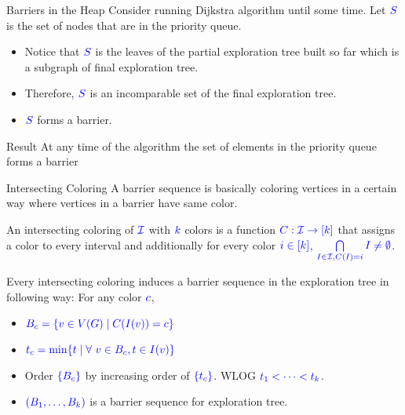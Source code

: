 \documentclass[10pt]{beamer}
\begin{document}
\begin{frame}{Barriers in the Heap}
	Consider running Dijkstra algorithm until some time. Let $\mathcolor{blue}{S}$ is the set of nodes that are in the priority queue.\pause
	\begin{itemize}
		\item Notice that $\mathcolor{blue}{S}$ is the leaves of the partial exploration tree built so far which is a subgraph of final exploration tree.\pause
		\item Therefore, $\mathcolor{blue}{S}$ is an incomparable set of the final exploration tree.
		\item $\mathcolor{blue}{S}$ forms a barrier.
	\end{itemize}\pause \vfill

	\begin{alertblock}{Result}
		At any time of the algorithm the set of elements in the priority queue forms a barrier
	\end{alertblock}
\end{frame}
\begin{frame}{Intersecting Coloring}
	A barrier sequence is basically coloring vertices in a certain way where vertices in a barrier have same color.\pause
	\begin{definition}
		An intersecting coloring of $\mathcolor{blue}{\mathcal{I}}$ with $\mathcolor{blue}{k}$ colors is a function $\mathcolor{blue}{C:\mathcal{I}\to [k]}$ that assigns a color to every interval and additionally for every color $\mathcolor{blue}{i\in[k]}$, $\mathcolor{blue}{\bigcap\limits_{I\in\mathcal{I}, C(I)=i}I\neq \emptyset}$.
	\end{definition}\pause \vfill

	Every intersecting coloring induces a barrier sequence in the exploration tree in following way: For any color $\mathcolor{blue}{c}$,\pause
	\begin{itemize}
		\item  $\mathcolor{blue}{B_c=\{v\in V(G)\mid C(I(v))=c\}}$\pause
		\item $\mathcolor{blue}{t_c=\min\{t\mid \forall\ v\in B_c, t\in I(v)\}}$\pause
		\item Order $\mathcolor{blue}{\{B_c\}}$ by increasing order of $\mathcolor{blue}{\{t_c\}}$. WLOG $\mathcolor{blue}{t_1<\cdots <t_k}$.\pause
		\item $\mathcolor{blue}{(B_1,\dots, B_k)}$ is a barrier sequence for exploration tree.
	\end{itemize}
\end{frame}
\end{document}
